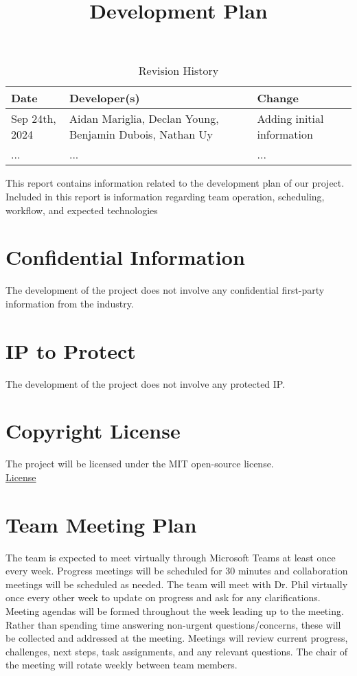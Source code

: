 \documentclass{article}
\title{Development Plan\\\progname}
\author{\authname}
\date{}
\begin{document}
\maketitle

\begin{table}[hp]
\caption{Revision History} \label{TblRevisionHistory}
\begin{tabularx}{\textwidth}{lp{5cm}X}
\toprule
\textbf{Date} & \textbf{Developer(s)} & \textbf{Change}\\
\midrule
Sep 24th, 2024 & Aidan Mariglia, Declan Young, Benjamin Dubois, Nathan Uy & Adding initial information\\
... & ... & ...\\
\bottomrule
\end{tabularx}
\end{table}

\newpage{}

This report contains information related to the development plan of our project. Included in this report is information regarding team operation, scheduling, workflow, and expected technologies

\section{Confidential Information}

The development of the project does not involve any confidential first-party information from the industry.

\section{IP to Protect}

The development of the project does not involve any protected IP.

\section{Copyright License}

The project will be licensed under the MIT open-source license. \\
\href{https://github.com/AidanMariglia/SOCAlgoTestPlatform/blob/main/LICENSE}{License}

\section{Team Meeting Plan}

The team is expected to meet virtually through Microsoft Teams at least once every week. Progress meetings will be scheduled for 30 minutes and collaboration meetings will be scheduled as needed. The team will meet with Dr. Phil virtually once every other week to update on progress and ask for any clarifications. Meeting agendas will be formed throughout the week leading up to the meeting. Rather than spending time answering non-urgent questions/concerns, these will be collected and addressed at the meeting. Meetings will review current progress, challenges, next steps, task assignments, and any relevant questions. The chair of the meeting will rotate weekly between team members.
\end{document}
